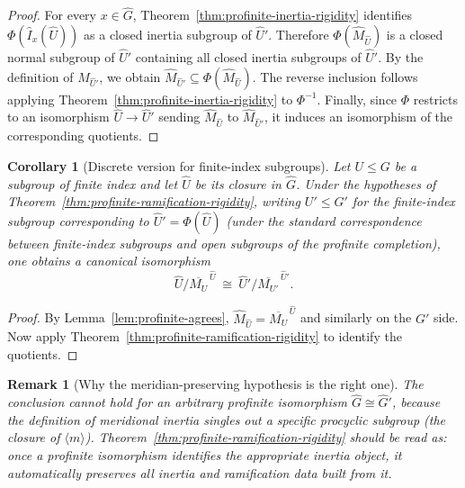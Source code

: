 \documentclass[11pt]{article}
\newtheorem{corollary}[theorem]{Corollary}
\newtheorem{remark}[theorem]{Remark}
\begin{document}
\begin{proof}
	For every $x\in \widehat G$, Theorem~\ref{thm:profinite-inertia-rigidity} identifies $\Phi(\widehat I_x(\widehat U))$ as a closed inertia subgroup of $\widehat U'$. Therefore $\Phi(\widehat M_{\widehat U})$ is a closed normal subgroup of $\widehat U'$ containing all closed inertia subgroups of $\widehat U'$. By the definition of $\widehat M_{\widehat U'}$, we obtain $\widehat M_{\widehat U'} \subseteq \Phi(\widehat M_{\widehat U})$. The reverse inclusion follows applying Theorem~\ref{thm:profinite-inertia-rigidity} to $\Phi^{-1}$.
	Finally, since $\Phi$ restricts to an isomorphism $\widehat U\to \widehat U'$ sending $\widehat M_{\widehat U}$ to $\widehat M_{\widehat U'}$, it induces an isomorphism of the corresponding quotients.
\end{proof}

\begin{corollary}[Discrete version for finite-index subgroups]\label{cor:discrete-profinite-quotients}
	Let $U\le G$ be a subgroup of finite index and let $\widehat U$ be its closure in $\widehat G$. Under the hypotheses of Theorem~\ref{thm:profinite-ramification-rigidity}, writing $U'\le G'$ for the finite-index subgroup corresponding to $\widehat U'=\Phi(\widehat U)$ (under the standard correspondence between finite-index subgroups and open subgroups of the profinite completion), one obtains a canonical isomorphism
	\[ \widehat U/\overline{M_U}^{\,\widehat U}\ \cong\ \widehat U'/\overline{M_{U'}}^{\,\widehat U'}.\]
\end{corollary}

\begin{proof}
	By Lemma~\ref{lem:profinite-agrees}, $\widehat M_{\widehat U}=\overline{M_U}^{\,\widehat U}$ and similarly on the $G'$ side. Now apply Theorem~\ref{thm:profinite-ramification-rigidity} to identify the quotients.
\end{proof}

\begin{remark}[Why the meridian-preserving hypothesis is the right one]
	The conclusion cannot hold for an \emph{arbitrary} profinite isomorphism $\widehat G\cong \widehat G'$, because the definition of meridional inertia singles out a specific procyclic subgroup (the closure of $\langle m\rangle$). Theorem~\ref{thm:profinite-ramification-rigidity} should be read as: \emph{once a profinite isomorphism identifies the appropriate inertia object, it automatically preserves all inertia and ramification data built from it.}
\end{remark}
\end{document}
